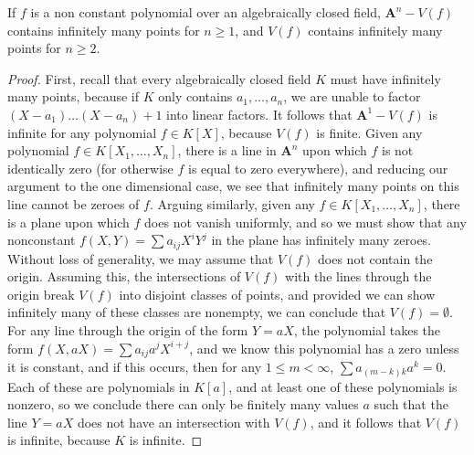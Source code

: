 \begin{prop}
    If $f$ is a non constant polynomial over an algebraically closed field, $\mathbf{A}^n - V(f)$ contains infinitely many points for $n \geq 1$, and $V(f)$ contains infinitely many points for $n \geq 2$.
\end{prop}
\begin{proof}
    First, recall that every algebraically closed field $K$ must have infinitely many points, because if $K$ only contains $a_1, \dots, a_n$, we are unable to factor $(X - a_1) \dots (X - a_n) + 1$ into linear factors. It follows that $\mathbf{A}^1 - V(f)$ is infinite for any polynomial $f \in K[X]$, because $V(f)$ is finite. Given any polynomial $f \in K[X_1, \dots, X_n]$, there is a line in $\mathbf{A}^n$ upon which $f$ is not identically zero (for otherwise $f$ is equal to zero everywhere), and reducing our argument to the one dimensional case, we see that infinitely many points on this line cannot be zeroes of $f$. Arguing similarly, given any $f \in K[X_1, \dots, X_n]$, there is a plane upon which $f$ does not vanish uniformly, and so we must show that any nonconstant $f(X,Y) = \sum a_{ij} X^i Y^j$ in the plane has infinitely many zeroes. Without loss of generality, we may assume that $V(f)$ does not contain the origin. Assuming this, the intersections of $V(f)$ with the lines through the origin break $V(f)$ into disjoint classes of points, and provided we can show infinitely many of these classes are nonempty, we can conclude that $V(f) = \emptyset$. For any line through the origin of the form $Y = aX$, the polynomial takes the form $f(X,aX) = \sum a_{ij} a^j X^{i+j}$, and we know this polynomial has a zero unless it is constant, and if this occurs, then for any $1 \leq m < \infty$, $\sum a_{(m-k)k} a^k = 0$. Each of these are polynomials in $K[a]$, and at least one of these polynomials is nonzero, so we conclude there can only be finitely many values $a$ such that the line $Y = aX$ does not have an intersection with $V(f)$, and it follows that $V(f)$ is infinite, because $K$ is infinite.
\end{proof}

